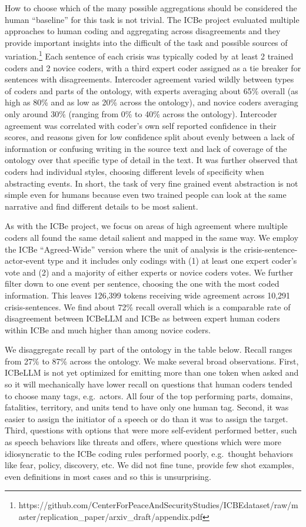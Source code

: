 \documentclass[
]{article}
\begin{document}
How to choose which of the many possible aggregations should be
considered the human ``baseline'' for this task is not trivial. The ICBe
project evaluated multiple approaches to human coding and aggregating
across disagreements and they provide important insights into the
difficult of the task and possible sources of variation.\footnote{https://github.com/CenterForPeaceAndSecurityStudies/ICBEdataset/raw/master/replication\_paper/arxiv\_draft/appendix.pdf}
Each sentence of each crisis was typically coded by at least 2 trained
coders and 2 novice coders, with a third expert coder assigned as a tie
breaker for sentences with disagreements. Intercoder agreement varied
wildly between types of coders and parts of the ontology, with experts
averaging about 65\% overall (as high as 80\% and as low as 20\% across
the ontology), and novice coders averaging only around 30\% (ranging
from 0\% to 40\% across the ontology). Intercoder agreement was
correlated with coder's own self reported confidence in their scores,
and reasons given for low confidence split about evenly between a lack
of information or confusing writing in the source text and lack of
coverage of the ontology over that specific type of detail in the text.
It was further observed that coders had individual styles, choosing
different levels of specificity when abstracting events. In short, the
task of very fine grained event abstraction is not simple even for
humans because even two trained people can look at the same narrative
and find different details to be most salient.

As with the ICBe project, we focus on areas of high agreement where
multiple coders all found the same detail salient and mapped in the same
way. We employ the ICBe ``Agreed-Wide'' version where the unit of
analysis is the crisis-sentence-actor-event type and it includes only
codings with (1) at least one expert coder's vote and (2) and a majority
of either experts or novice coders votes. We further filter down to one
event per sentence, choosing the one with the most coded information.
This leaves 126,399 tokens receiving wide agreement across 10,291
crisis-sentences. We find about 72\% recall overall which is a
comparable rate of disagreement between ICBeLLM and ICBe as between
expert human coders within ICBe and much higher than among novice
coders.

We disaggregate recall by part of the ontology in the table below.
Recall ranges from 27\% to 87\% across the ontology. We make several
broad observations. First, ICBeLLM is not yet optimized for emitting
more than one token when asked and so it will mechanically have lower
recall on questions that human coders tended to choose many tags,
e.g.~actors. All four of the top performing parts, domains, fatalities,
territory, and units tend to have only one human tag. Second, it was
easier to assign the initiator of a speech or do than it was to assign
the target. Third, questions with options that were more self-evident
performed better, such as speech behaviors like threats and offers,
where questions which were more idiosyncratic to the ICBe coding rules
performed poorly, e.g.~thought behaviors like fear, policy, discovery,
etc. We did not fine tune, provide few shot examples, even definitions
in most cases and so this is unsurprising.
\end{document}
